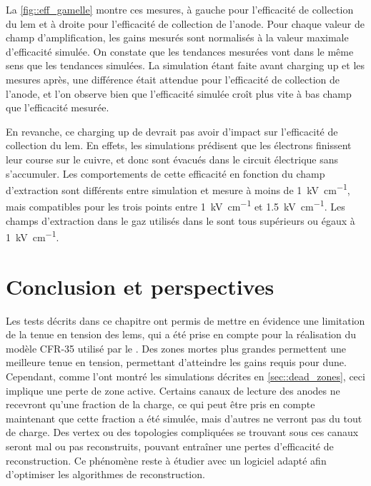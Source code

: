       La \autoref{fig::eff_gamelle} montre ces mesures, à gauche pour l'efficacité de collection du \gls{lem} et à droite pour l'efficacité de collection de l'anode. Pour chaque valeur de champ d'amplification, les gains mesurés sont normalisés à la valeur maximale d'efficacité simulée. On constate que les tendances mesurées vont dans le même sens que les tendances simulées. La simulation étant faite avant charging up et les mesures après, une différence était attendue pour l'efficacité de collection de l'anode, et l'on observe bien que l'efficacité simulée croît plus vite à bas champ que l'efficacité mesurée.

      En revanche, ce charging up de devrait pas avoir d'impact sur l'efficacité de collection du \gls{lem}. En effets, les simulations prédisent que les électrons finissent leur course sur le cuivre, et donc sont évacués dans le circuit électrique sans s'accumuler. Les comportements de cette efficacité en fonction du champ d'extraction sont différents entre simulation et mesure à moins de \SI{1}{\kilo\volt\per\centi\meter}, mais compatibles pour les trois points entre \SI{1}{\kilo\volt\per\centi\meter} et \SI{1.5}{\kilo\volt\per\centi\meter}. Les champs d'extraction dans le gaz utilisés dans le \TOO{} sont tous supérieurs ou égaux à \SI{1}{\kilo\volt\per\centi\meter}.

       
  \section{Conclusion et perspectives}

    Les tests décrits dans ce chapitre ont permis de mettre en évidence une limitation de la tenue en tension des \glspl{lem}, qui a été prise en compte pour la réalisation du modèle CFR-35 utilisé par le \SSS{}. Des zones mortes plus grandes permettent une meilleure tenue en tension, permettant d'atteindre les gains requis pour \gls{dune}. Cependant, comme l'ont montré les simulations décrites en \autoref{sec::dead_zones}, ceci implique une perte de zone active. Certains canaux de lecture des anodes ne recevront qu'une fraction de la charge, ce qui peut être pris en compte maintenant que cette fraction a été simulée, mais d'autres ne verront pas du tout de charge. Des vertex ou des topologies compliquées se trouvant sous ces canaux seront mal ou pas reconstruits, pouvant entraîner une pertes d'efficacité de reconstruction. Ce phénomène reste à étudier avec un logiciel adapté afin d'optimiser les algorithmes de reconstruction.

